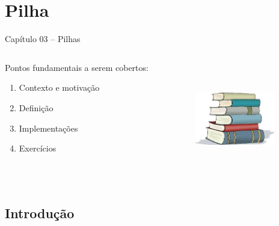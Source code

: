 

\section{Pilha}

\begin{frame}[c]{\Large Capítulo 03 -- Pilhas}


\begin{columns}
\begin{column}{.5\textwidth}
\centering
Pontos fundamentais a serem cobertos:
  \begin{enumerate}
  \item Contexto e motivação
  \item Definição
  \item Implementações
  \item Exercícios 
\end{enumerate}  

\end{column}
\begin{column}{.5\textwidth}
\centering
\includegraphics[height=5cm, width=3.5cm]{figs/fig_pilhas/pilha_livro.jpeg}
\end{column}
\end{columns}

\end{frame}



\subsection{Introdução} 

